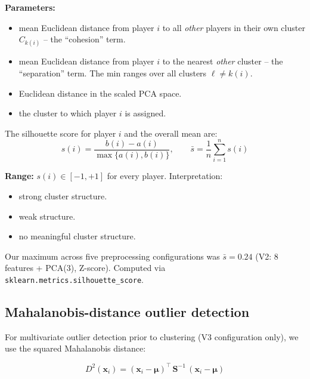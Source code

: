 \documentclass[11pt, a4paper, oneside, openany]{report}
\begin{document}
\noindent\textbf{Parameters:}
\begin{itemize}[leftmargin=2.2cm, itemsep=0pt, topsep=2pt]
    \item[$a(i)$] mean Euclidean distance from player $i$ to all \emph{other} players in their own cluster $C_{k(i)}$ -- the ``cohesion'' term.
    \item[$b(i)$] mean Euclidean distance from player $i$ to the nearest \emph{other} cluster -- the ``separation'' term. The min ranges over all clusters $\ell \neq k(i)$.
    \item[$d(\mathbf{x}_i, \mathbf{x}_j)$] Euclidean distance in the scaled PCA space.
    \item[$C_{k(i)}$] the cluster to which player $i$ is assigned.
\end{itemize}

The silhouette score for player $i$ and the overall mean are:
\begin{equation}
\label{eq:silhouette}
s(i) = \frac{b(i) - a(i)}{\max\{a(i), b(i)\}}, \qquad \bar{s} = \frac{1}{n} \sum_{i=1}^{n} s(i)
\end{equation}

\noindent\textbf{Range:} $s(i) \in [-1, +1]$ for every player. Interpretation:
\begin{itemize}[leftmargin=2.2cm, itemsep=0pt, topsep=2pt]
    \item[$\bar{s} \geq 0.50$] strong cluster structure.
    \item[$0.25 \leq \bar{s} < 0.50$] weak structure.
    \item[$\bar{s} < 0.25$] no meaningful cluster structure.
\end{itemize}

\noindent Our maximum across five preprocessing configurations was $\bar{s} = 0.24$ (V2: 8 features + PCA(3), Z-score). Computed via \texttt{sklearn.metrics.silhouette\_score}.

\subsection{Mahalanobis-distance outlier detection}

For multivariate outlier detection prior to clustering (V3 configuration only), we use the squared Mahalanobis distance:

\begin{equation}
\label{eq:mahalanobis}
D^2(\mathbf{x}_i) = (\mathbf{x}_i - \boldsymbol{\mu})^\top\, \mathbf{S}^{-1}\, (\mathbf{x}_i - \boldsymbol{\mu})
\end{equation}
\end{document}
